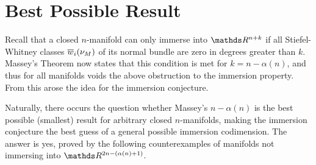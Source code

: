 \section{Best Possible Result}\label{sec:bestpossibleresult}
Recall that a closed $n$-manifold can only immerse into
$\R^{n+k}$ if all Stiefel-Whitney classes ${\overline{w}_{i}}(\nu_{M})$ of its
normal bundle are zero in degrees greater than $k$.
Massey's Theorem now states that this condition is met for
$k=n-\alpha(n)$, and thus for all manifolds voids the above
obstruction to the immersion property. From this arose the idea for
the immersion conjecture.

Naturally, there occurs the question whether Massey's $n-\alpha(n)$ is
the best possible (\idest smallest) result for arbitrary closed
$n$-manifolds, making the immersion conjecture the best
guess of a general possible immersion codimension.
The answer is yes, proved by the following counterexamples of manifolds
not immersing into $\R^{2n-(\alpha(n)+1)}$.

